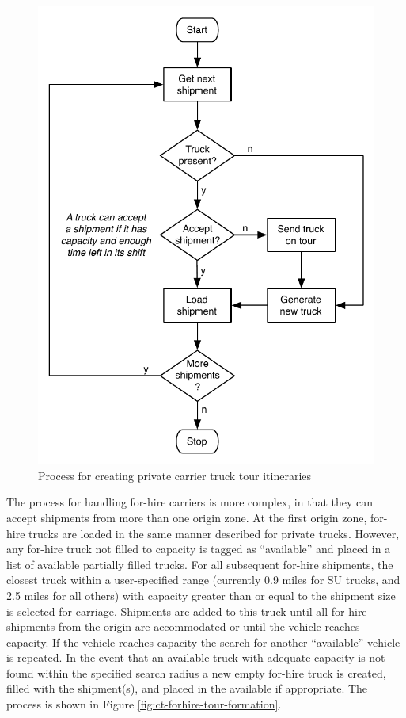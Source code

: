 \begin{figure}[!t]
\centering
\includegraphics[scale=0.7]{ct/PrivateTrucks}
\caption{Process for creating private carrier truck tour itineraries}
\label{fig:ct-private-tour-formation}
\end{figure}

The process for handling for-hire carriers is more complex, in that they can accept shipments from more than one origin zone. At the first origin zone, for-hire trucks are loaded in the same manner described for private trucks. However, any for-hire truck not filled to capacity is tagged as ``available'' and placed in a list of available partially filled trucks. For all subsequent for-hire shipments, the closest truck within a user-specified range (currently 0.9 miles for SU trucks, and 2.5 miles for all others) with capacity greater than or equal to the shipment size is selected for carriage. Shipments are added to this truck until all for-hire shipments from the origin are accommodated or until the vehicle reaches capacity. If the vehicle reaches capacity the search for another ``available'' vehicle is repeated. In the event that an available truck with adequate capacity is not found within the specified search radius a new empty for-hire truck is created, filled with the shipment(s), and placed in the available if appropriate. The process is shown in Figure \ref{fig:ct-forhire-tour-formation}.

